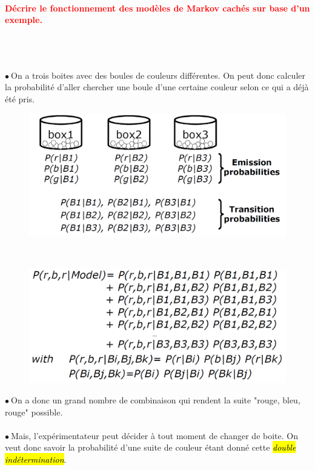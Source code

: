 \documentclass[letterpaper, 12pt]{article}
\newcommand{\red}[1]{
	\textcolor{red}{#1}
}
\newcommand{\point}{$\bullet\ $}
\begin{document}
		\paragraph{\red{Décrire le fonctionnement des modèles de Markov cachés sur base d'un exemple.}}~\\~\\
			\begin{minipage}{0.4\textwidth}
				\point On a trois boites avec des boules de couleurs différentes. On peut donc calculer la 
					probabilité d'aller chercher une boule d'une certaine couleur selon ce qui a déjà été pris.
			\end{minipage}\hfill
			\begin{minipage}{0.55\textwidth}
				\begin{figure}[H]
					\centering
					\includegraphics[scale=0.245]{Images/hmm}
				\end{figure}\noindent
			\end{minipage}~\\
			\begin{minipage}{0.4\textwidth}
				\begin{figure}[H]
					\includegraphics[scale=0.3]{Images/hmm2}
				\end{figure}\noindent
			\end{minipage}\hfill
			\begin{minipage}{0.55\textwidth}
				\point On a donc un grand nombre de combinaison qui rendent la suite "rouge, bleu, rouge" 
					possible.\\~\\
				\point Mais, l'expérimentateur peut décider à tout moment de changer de boite. On veut donc savoir
					la probabilité d'une suite de couleur étant donné cette \textit{\hl{double ind\'etermination}}.
			\end{minipage}
\end{document}
